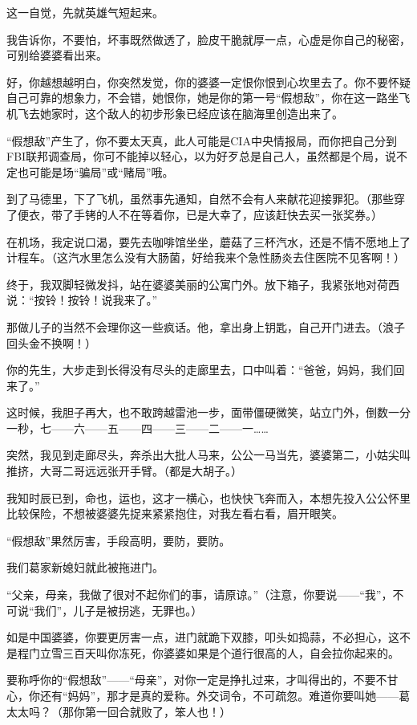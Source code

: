 \par 这一自觉，先就英雄气短起来。
\par 我告诉你，不要怕，坏事既然做透了，脸皮干脆就厚一点，心虚是你自己的秘密，可别给婆婆看出来。
\par 好，你越想越明白，你突然发觉，你的婆婆一定恨你恨到心坎里去了。你不要怀疑自己可靠的想象力，不会错，她恨你，她是你的第一号“假想敌”，你在这一路坐飞机飞去她家时，这个敌人的初步形象已经应该在脑海里创造出来了。
\par “假想敌”产生了，你不要太天真，此人可能是CIA中央情报局，而你把自己分到FBI联邦调查局，你可不能掉以轻心，以为好歹总是自己人，虽然都是个局，说不定也可能是场“骗局”或“赌局”哦。
\par 到了马德里，下了飞机，虽然事先通知，自然不会有人来献花迎接罪犯。（那些穿了便衣，带了手铐的人不在等着你，已是大幸了，应该赶快去买一张奖券。）
\par 在机场，我定说口渴，要先去咖啡馆坐坐，蘑菇了三杯汽水，还是不情不愿地上了计程车。（这汽水里怎么没有大肠菌，好给我来个急性肠炎去住医院不见客啊！）
\par 终于，我双脚轻微发抖，站在婆婆美丽的公寓门外。放下箱子，我紧张地对荷西说：“按铃！按铃！说我来了。”
\par 那做儿子的当然不会理你这一些疯话。他，拿出身上钥匙，自己开门进去。（浪子回头金不换啊！）
\par 你的先生，大步走到长得没有尽头的走廊里去，口中叫着：“爸爸，妈妈，我们回来了。”
\par 这时候，我胆子再大，也不敢跨越雷池一步，面带僵硬微笑，站立门外，倒数一分一秒，七——六——五——四——三——二——一……
\par 突然，我见到走廊尽头，奔杀出大批人马来，公公一马当先，婆婆第二，小姑尖叫推挤，大哥二哥远远张开手臂。（都是大胡子。）
\par 我知时辰已到，命也，运也，这才一横心，也快快飞奔而入，本想先投入公公怀里比较保险，不想被婆婆先捉来紧紧抱住，对我左看右看，眉开眼笑。
\par “假想敌”果然厉害，手段高明，要防，要防。
\par 我们葛家新媳妇就此被拖进门。
\par “父亲，母亲，我做了很对不起你们的事，请原谅。”（注意，你要说——“我”，不可说“我们”，儿子是被拐逃，无罪也。）
\par 如是中国婆婆，你要更厉害一点，进门就跪下双膝，叩头如捣蒜，不必担心，这不是程门立雪三百天叫你冻死，你婆婆如果是个道行很高的人，自会拉你起来的。
\par 要称呼你的“假想敌”——“母亲”，对你一定是挣扎过来，才叫得出的，不要不甘心，你还有“妈妈”，那才是真的爱称。外交词令，不可疏忽。难道你要叫她——葛太太吗？（那你第一回合就败了，笨人也！）
